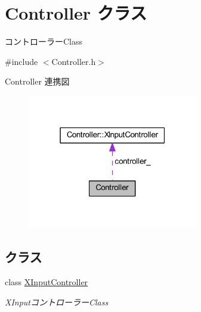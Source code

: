 \hypertarget{class_controller}{}\section{Controller クラス}
\label{class_controller}


コントローラー\+Class  




{\ttfamily \#include $<$Controller.\+h$>$}



Controller 連携図\nopagebreak
\begin{figure}[H]
\begin{center}
\leavevmode
\includegraphics[width=211pt]{class_controller__coll__graph}
\end{center}
\end{figure}
\subsection*{クラス}
\begin{DoxyCompactItemize}
\item 
class \mbox{\hyperlink{class_controller_1_1_x_input_controller}{X\+Input\+Controller}}
\begin{DoxyCompactList}\small\item\em X\+Inputコントローラー\+Class \end{DoxyCompactList}\end{DoxyCompactItemize}
